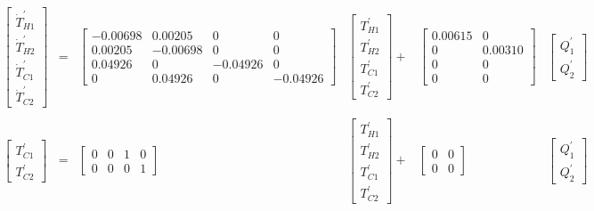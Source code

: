 \begin{equation}
	\label{eq:tclab_modelo_teorico}
	\begin{aligned}
		\begin{bmatrix}
			\dot{T}_{H1}^{'}	\\
			\dot{T}_{H2}^{'}	\\
			\dot{T}_{C1}^{'}	\\
			\dot{T}_{C2}^{'}
		\end{bmatrix}
		&=&
		\begin{bmatrix}
			-0.00698		&		0.00205		&		0			&		0		\\
			0.00205			&		-0.00698	&		0			&		0		\\
			0.04926			&		0			&		-0.04926	&		0		\\
				 0			&		0.04926		&		0			&		-0.04926	
		\end{bmatrix}
		&
		\begin{bmatrix}
			T_{H1}^{'}	\\
			T_{H2}^{'}	\\
			T_{C1}^{'}	\\
			T_{C2}^{'}
		\end{bmatrix}
		+&
		\begin{bmatrix}
			0.00615		&		0		\\
			0			&		0.00310	\\
			0			&		0		\\
			0			&		0	
		\end{bmatrix}
		&
		\begin{bmatrix}
			Q_{1}^{'}		\\
			Q_{2}^{'}
		\end{bmatrix}
		\\
		\\
		\begin{bmatrix}
			T_{C1}^{'}	\\
			T_{C2}^{'}
		\end{bmatrix}
		&=&
		\begin{bmatrix}
			0	&	0	&	1	&	0	\\
			0	&	0	&	0	&	1
		\end{bmatrix}
		&
		\begin{bmatrix}
			T_{H1}^{'}	\\
			T_{H2}^{'}	\\
			T_{C1}^{'}	\\
			T_{C2}^{'}
		\end{bmatrix}
		+&
		\begin{bmatrix}
			0	&	0	\\
			0	&	0
		\end{bmatrix}
		&
		\begin{bmatrix}
			Q_{1}^{'}		\\
			Q_{2}^{'}
		\end{bmatrix}
	\end{aligned}
\end{equation}


